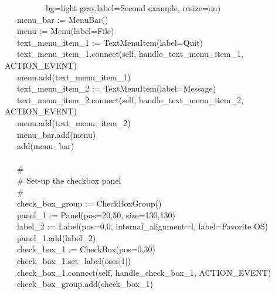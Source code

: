 {\>   \ \ \ \ \ \ \ \ \ \ {\textquotedbl}bg=light
gray{\textquotedbl},{\textquotedbl}label=Second example{\textquotedbl},
{\textquotedbl}resize=on{\textquotedbl}) \\
\>   \ \ \ menu\_bar := MenuBar() \\
\>   \ \ \ menu := Menu({\textquotedbl}label=File{\textquotedbl}) \\
\>   \ \ \ text\_menu\_item\_1 :=
TextMenuItem({\textquotedbl}label=Quit{\textquotedbl}) \\
\>   \ \ \ text\_menu\_item\_1.connect(self,
{\textquotedbl}handle\_text\_menu\_item\_1{\textquotedbl},\\
\>\>\>\>\>ACTION\_EVENT) \\
\>   \ \ \ menu.add(text\_menu\_item\_1) \\
\>   \ \ \ text\_menu\_item\_2 :=
TextMenuItem({\textquotedbl}label=Message{\textquotedbl}) \\
\>   \ \ \ text\_menu\_item\_2.connect(self,
{\textquotedbl}handle\_text\_menu\_item\_2{\textquotedbl},\\
\>\>\>\>\>ACTION\_EVENT) \\
\>   \ \ \ menu.add(text\_menu\_item\_2) \\
\>   \ \ \ menu\_bar.add(menu) \\
\>   \ \ \ add(menu\_bar) \\
\ \\
\>   \ \ \ \# \\
\>   \ \ \ \# Set-up the checkbox panel \\
\>   \ \ \ \# \\
\>   \ \ \ check\_box\_group := CheckBoxGroup() \\
\>   \ \ \ panel\_1 := Panel({\textquotedbl}pos=20,50{\textquotedbl},
{\textquotedbl}size=130,130{\textquotedbl}) \\
\>   \ \ \ label\_2 := Label({\textquotedbl}pos=0,0{\textquotedbl},
{\textquotedbl}internal\_alignment=l{\textquotedbl},
{\textquotedbl}label=Favorite OS{\textquotedbl}) \\
\>   \ \ \ panel\_1.add(label\_2) \\
\>   \ \ \ check\_box\_1 :=
CheckBox({\textquotedbl}pos=0,30{\textquotedbl}) \\
\>   \ \ \ check\_box\_1.set\_label(oses[1]) \\
\>   \ \ \ check\_box\_1.connect(self,
{\textquotedbl}handle\_check\_box\_1{\textquotedbl}, ACTION\_EVENT) \\
\>   \ \ \ check\_box\_group.add(check\_box\_1) \\
}
